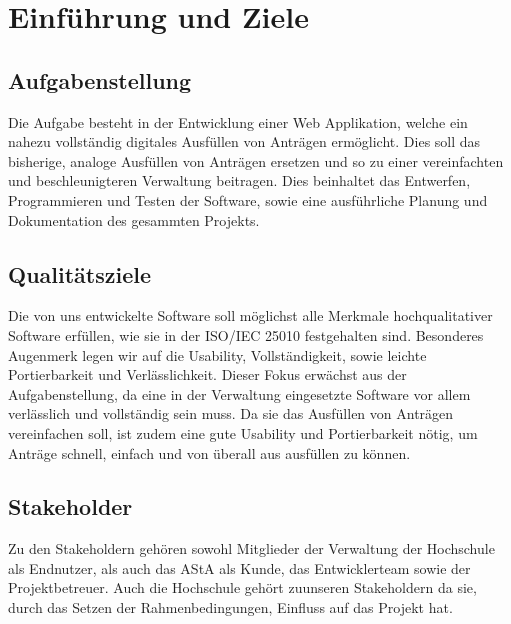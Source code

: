 \chapter{Einführung und Ziele}\label{ch:einfuhrung-und-ziele}

\section{Aufgabenstellung}\label{sec:aufgabenstellung}
Die Aufgabe besteht in der Entwicklung einer Web Applikation, welche ein nahezu vollständig digitales
Ausfüllen von Anträgen ermöglicht. Dies soll das bisherige, analoge Ausfüllen von Anträgen ersetzen und so zu einer vereinfachten und beschleunigteren Verwaltung beitragen. Dies beinhaltet das Entwerfen, Programmieren und Testen der 
Software, sowie eine ausführliche Planung und Dokumentation des gesammten Projekts.

\section{Qualitätsziele}\label{sec:qualitatsziele}
Die von uns entwickelte Software soll möglichst alle Merkmale hochqualitativer Software erfüllen, wie 
sie in der ISO/IEC 25010 festgehalten sind. Besonderes Augenmerk legen wir auf die Usability, 
Vollständigkeit, sowie leichte Portierbarkeit und Verlässlichkeit. Dieser Fokus erwächst aus der 
Aufgabenstellung, da eine in der Verwaltung eingesetzte Software vor allem verlässlich und vollständig 
sein muss. Da sie das Ausfüllen von Anträgen vereinfachen soll, ist zudem eine gute Usability und
Portierbarkeit nötig, um Anträge schnell, einfach und von überall aus ausfüllen zu können.

\section{Stakeholder}\label{sec:stakeholder}
Zu den Stakeholdern gehören sowohl Mitglieder der Verwaltung der Hochschule als Endnutzer, als auch
das AStA als Kunde, das Entwicklerteam sowie der Projektbetreuer. Auch die Hochschule 
gehört zuunseren Stakeholdern da sie, durch das Setzen der Rahmenbedingungen, Einfluss auf das 
Projekt hat.